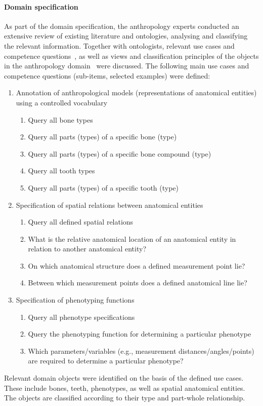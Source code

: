 \documentclass[sw]{iosart2x}
\begin{document}
\paragraph{Domain specification}
As part of the domain specification, the anthropology experts conducted an extensive review of existing literature and ontologies, analysing and classifying the relevant information.
Together with ontologists, relevant use cases and competence questions\footnotemark{}~\citep{XD2016, MOMo2023}, as well as views and classification principles of the objects in the anthropology domain~\citep{herre2010} were discussed.
%
The following main use cases and competence questions (sub-items, selected examples) were defined:
\begin{enumerate}
\item Annotation of anthropological models (representations of anatomical entities) using a controlled vocabulary
\begin{enumerate}
\item Query all bone types
\item Query all parts (types) of a specific bone (type)
\item Query all parts (types) of a specific bone compound (type)
\item Query all tooth types
\item Query all parts (types) of a specific tooth (type)
\end{enumerate}
\item Specification of spatial relations between anatomical entities
\begin{enumerate}
\item Query all defined spatial relations
\item What is the relative anatomical location of an anatomical entity in relation to another anatomical entity?
\item On which anatomical structure does a defined measurement point lie?
\item Between which measurement points does a defined anatomical line lie?
\end{enumerate}
\item Specification of phenotyping functions
\begin{enumerate}
\item Query all phenotype specifications
\item Query the phenotyping function for determining a particular phenotype
\item Which parameters/variables (e.g., measurement distances/angles/points) are required to determine a particular phenotype?
\end{enumerate}
\end{enumerate}
Relevant domain objects were identified on the basis of the defined use cases.
These include bones, teeth, phenotypes, as well as spatial anatomical entities.
The objects are classified according to their type and part-whole relationship.
\end{document}
